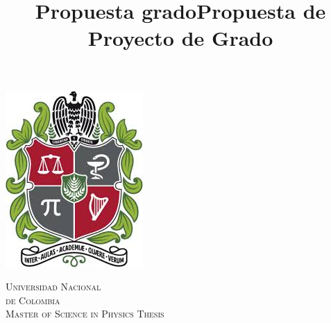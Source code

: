 \documentclass[12pt]{article}
\title{Propuesta grado}
\title{Propuesta de Proyecto de Grado}
\begin{document}
\begin{center}																		%
\newcommand{\HRule}{\rule{\linewidth}{0.5mm}}									%
\begin{minipage}{0.48\textwidth} %
\centering
\includegraphics[scale = 0.4]{EscudoU.jpg}
\end{minipage}

\vspace*{0.5cm}								%
\textsc{\huge Universidad Nacional\\ \vspace{5px} de Colombia}\\[1.5cm]	

\textsc{\Large Master of Science in Physics Thesis  }\\[1.5cm]													%


\end{center}
\end{document}
